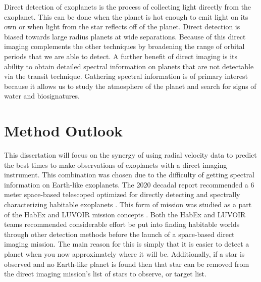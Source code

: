 Direct detection of exoplanets is the process of collecting light directly from
the exoplanet. This can be done when the planet is hot enough to emit light on
its own or when light from the star reflects off of the planet. Direct
detection is biased towards large radius planets at wide separations. Because
of this direct imaging complements the other techniques by broadening the range
of orbital periods that we are able to detect. A further benefit of direct
imaging is its ability to obtain detailed spectral information on planets that
are not detectable via the transit technique. Gathering spectral information
is of primary interest because it allows us to study the atmosphere of the
planet and search for signs of water and biosignatures.


\section{Method Outlook}
\label{sec:EPRV_HWO}

This dissertation will focus on the synergy of using radial velocity data to
predict the best times to make observations of exoplanets with a direct imaging
instrument. This combination was chosen due to the difficulty of getting
spectral information on Earth-like exoplanets. The 2020 decadal report
recommended a 6 meter space-based telescoped optimized for directly detecting
and spectrally characterizing habitable exoplanets
\citep{nationalacademiesofsciencesPathwaysDiscoveryAstronomy2021}. This form of
mission was studied as a part of the HabEx and LUVOIR mission concepts
\citep{gaudiHabitableExoplanetObservatory2020,TheLUVOIRTeam2019}. Both the
HabEx and LUVOIR teams recommended considerable effort be put into finding
habitable worlds through other detection methods before the launch of a
space-based direct imaging mission. The main reason for this is simply that it
is easier to detect a planet when you now approximately where it will be.
Additionally, if a star is observed and no Earth-like planet is found then
that star can be removed from the direct imaging mission's list of stars
to observe, or target list.

